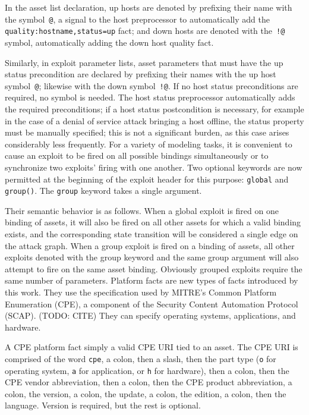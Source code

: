 In the asset list declaration, up hosts are denoted by prefixing their name with
the symbol~\texttt{@}, a signal to the host preprocessor to automatically add
the \texttt{quality:hostname,status=up} fact; and down hosts are denoted with
the~\texttt{!@} symbol, automatically adding the down host quality fact.

Similarly, in exploit parameter lists, asset parameters that must have the
up status precondition are declared by prefixing their names with the up host 
symbol~\texttt{@}; likewise with the down symbol~\texttt{!@}. If no host
status preconditions are required, no symbol is needed. The host status
preprocessor automatically adds the required preconditions; if a host status
postcondition is necessary, for example in the case of a denial of service
attack bringing a host offline, the status property must be manually specified;
this is not a significant burden, as this case arises considerably less
frequently.
For a variety of modeling tasks, it is convenient to cause an exploit to be
fired on all possible bindings simultaneously or to synchronize two exploits'
firing with one another. Two optional keywords are now permitted at the beginning
of the exploit header for this purpose: \texttt{global} and \texttt{group()}.
The \texttt{group} keyword takes a single argument.

Their semantic behavior
is as follows. When a global exploit is fired on one binding of assets, it will
also be fired on all other assets for which a valid binding exists, and the
corresponding state transition will be considered a single edge on the attack
graph. When a group exploit is fired on a binding of assets, all other exploits
denoted with the group keyword and the same group argument will also attempt
to fire on the same asset binding. Obviously grouped exploits require the same
number of parameters.
Platform facts are new types of facts introduced by this work. They use the
specification used by MITRE's Common Platform Enumeration (CPE), a component
of the Security Content Automation Protocol (SCAP). (TODO: CITE)
They can specify operating systems, applications, and hardware.

A CPE platform fact simply a valid CPE URI tied to an asset. The CPE URI is
comprised of the word \texttt{cpe}, a 
colon, then a slash, then the part type (\texttt{o} for operating system, \texttt{a} for
application, or \texttt{h} for hardware), then a colon, then the CPE vendor abbreviation,
then a colon, then the CPE product abbreviation, a colon, the version, a colon, the update, a colon, 
the edition, a colon, then the language. Version is required, but the rest is optional.

